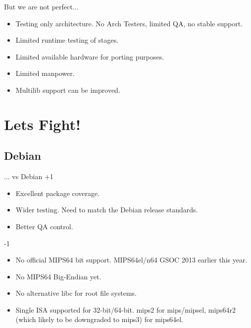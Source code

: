 \documentclass{beamer}
\begin{document}
\begin{frame}{But we are not perfect...}
	\begin{itemize}
		\item Testing only architecture. No Arch Testers, limited QA, no stable support.
		\item Limited runtime testing of stages.
		\item Limited available hardware for porting purposes.
		\item Limited manpower.
		\item Multilib support can be improved.
	\end{itemize}
\end{frame}


\section{Lets Fight{!}}

\subsection{Debian}
\begin{frame}{... vs Debian}
+1
	\begin{itemize}
		\item Excellent package coverage.
		\item Wider testing. Need to match the Debian release standards.
		\item Better QA control.
	\end{itemize}
-1
	\begin{itemize}
		\item No official MIPS64 bit support. MIPS64el/n64 GSOC 2013 earlier this year.
		\item No MIPS64 Big-Endian yet.
		\item No alternative libc for root file systems.
		\item Single ISA supported for 32-bit/64-bit. mips2 for mips/mipsel, mips64r2 (which likely to be downgraded to mips3) for mips64el.
	\end{itemize}
\end{frame}

\end{document}
